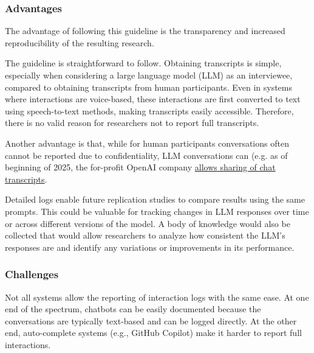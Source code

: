 

\subsubsection{Advantages}

The advantage of following this guideline is the transparency and increased reproducibility of the resulting research. 

The guideline is straightforward to follow. Obtaining transcripts is simple, especially when considering a large language model (LLM) as an interviewee, compared to obtaining transcripts from human participants. Even in systems where interactions are voice-based, these interactions are first converted to text using speech-to-text methods, making transcripts easily accessible. Therefore, there is no valid reason for researchers not to report full transcripts.

Another advantage is that, while for human participants conversations often cannot be reported due to confidentiality, LLM conversations can (e.g. as of beginning of 2025, the for-profit OpenAI company \href{https://openai.com/policies/sharing-publication-policy/}{allows sharing of chat transcripts}.

Detailed logs enable future replication studies to compare results using the same prompts. This could be valuable for tracking changes in LLM responses over time or across different versions of the model. A body of knowledge would also be collected that would allow researchers to analyze how consistent the LLM's responses are and identify any variations or improvements in its performance.



\subsubsection{Challenges}



Not all systems allow the reporting of interaction logs with the same ease. At one end of the spectrum, chatbots can be easily documented because the conversations are typically text-based and can be logged directly. At the other end, auto-complete systems (e.g., GitHub Copilot) make it harder to report full interactions. 


